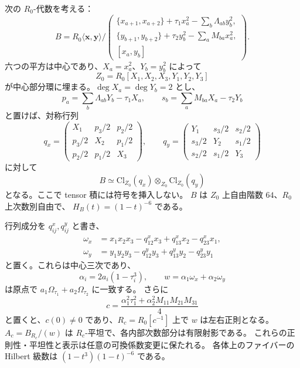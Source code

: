 \begin{proposition}
\label{ifb:prop:family}
次の $R_0$-代数を考える：
\begin{equation}\label{ifb:eq:family}
 B=R_0\langle\mathbf x,\mathbf y\rangle/
 \left(
 \begin{array}{l}
 \{x_{a+1},x_{a+2}\}+\tau_1x_a^2-\sum_b\Lambda_{ab}y_b^2,\\
 \{y_{b+1},y_{b+2}\}+\tau_2y_b^2-\sum_aM_{ba}x_a^2,\\
 {}[x_a,y_b]
 \end{array}\right).
\end{equation}
六つの平方は中心であり、$X_a=x_a^2$、$Y_b=y_b^2$ によって
\[
 Z_0=R_0[X_1,X_2,X_3,Y_1,Y_2,Y_3]
\]
が中心部分環に埋まる。$\deg X_a=\deg Y_b=2$ とし、
\[
 p_a=\sum_b\Lambda_{ab}Y_b-\tau_1X_a,
 \qquad s_b=\sum_aM_{ba}X_a-\tau_2Y_b
\]
と置けば、対称行列
\begin{equation}\label{ifb:eq:clifford-matrices}
 q_x=\begin{pmatrix}
 X_1&p_3/2&p_2/2\\p_3/2&X_2&p_1/2\\p_2/2&p_1/2&X_3
 \end{pmatrix},\qquad
 q_y=\begin{pmatrix}
 Y_1&s_3/2&s_2/2\\s_3/2&Y_2&s_1/2\\s_2/2&s_1/2&Y_3
 \end{pmatrix}
\end{equation}
に対して
\begin{equation}\label{ifb:eq:clifford-tensor}
 B\simeq\mathrm{Cl}_{Z_0}(q_x)\otimes_{Z_0}\mathrm{Cl}_{Z_0}(q_y)
\end{equation}
となる。ここで tensor 積には符号を挿入しない。
$B$ は $Z_0$ 上自由階数 $64$、$R_0$ 上次数別自由で、
$H_B(t)=(1-t)^{-6}$ である。

行列成分を $q^x_{ij},q^y_{ij}$ と書き、
\begin{align*}
 \omega_x&=x_1x_2x_3-q^x_{12}x_3+q^x_{13}x_2-q^x_{23}x_1,\\
 \omega_y&=y_1y_2y_3-q^y_{12}y_3+q^y_{13}y_2-q^y_{23}y_1
\end{align*}
と置く。これらは中心三次であり、
\[
 \alpha_i=2a_i(1-\tau_i^3),\qquad
 w=\alpha_1\omega_x+\alpha_2\omega_y
\]
は原点で $a_1\Omega_{\tau_1}+a_2\Omega_{\tau_2}$ に一致する。
さらに
\begin{equation}\label{ifb:eq:central-open}
 c=\frac{\alpha_1^2\tau_1^2+
                   \alpha_2^2M_{11}M_{21}M_{31}}4
\end{equation}
と置くと、$c(0)\ne0$ であり、$R_c=R_0[c^{-1}]$ 上で $w$ は左右正則となる。
$A_c=B_{R_c}/(w)$ は $R_c$-平坦で、各内部次数部分は有限射影である。
これらの正則性・平坦性と表示は任意の可換係数変更に保たれる。
各体上のファイバーの Hilbert 級数は $(1-t^3)(1-t)^{-6}$ である。
\end{proposition}

